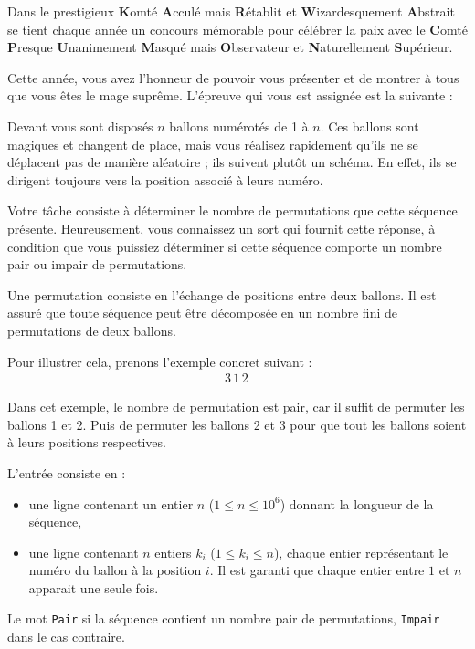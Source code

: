 \problemname{\problemyamlname}


Dans le prestigieux \textbf{K}omté \textbf{A}cculé mais \textbf{R}établit et \textbf{W}izardesquement \textbf{A}bstrait se tient chaque année un concours mémorable pour célébrer la paix avec le \textbf{C}omté \textbf{P}resque \textbf{U}nanimement \textbf{M}asqué mais \textbf{O}bservateur et \textbf{N}aturellement \textbf{S}upérieur.

Cette année, vous avez l'honneur de pouvoir vous présenter et de montrer à tous que vous êtes le mage suprême. L'épreuve qui vous est assignée est la suivante :

Devant vous sont disposés $n$ ballons numérotés de 1 à $n$. Ces ballons sont magiques et changent de place, mais vous réalisez rapidement qu'ils ne se déplacent pas de manière aléatoire ; ils suivent plutôt un schéma. En effet, ils se dirigent toujours vers la position associé à leurs numéro.

Votre tâche consiste à déterminer le nombre de permutations que cette séquence présente. Heureusement, vous connaissez un sort qui fournit cette réponse, à condition que vous puissiez déterminer si cette séquence comporte un nombre pair ou impair de permutations.

Une permutation consiste en l'échange de positions entre deux ballons. Il est assuré que toute séquence peut être décomposée en un nombre fini de permutations de deux ballons.

Pour illustrer cela, prenons l'exemple concret suivant :
\begin{align*}
    3\, 1\, 2\,
\end{align*}

Dans cet exemple, le nombre de permutation est pair, car il suffit de permuter les ballons 1 et 2. Puis de permuter les ballons 2 et 3 pour que tout les ballons soient à leurs positions respectives.

\begin{Input}
    L'entrée consiste en :
    \begin{itemize}
        \item une ligne contenant un entier $n$ ($1 \le n \le 10^6$) donnant la longueur de la séquence,
        \item une ligne contenant $n$ entiers $k_i $ ($1 \le k_i \le n$), chaque entier représentant le numéro du ballon à la position $i$. Il est garanti que chaque entier entre $1$ et $n$ apparait une seule fois.
    \end{itemize}
\end{Input}

\begin{Output}
    Le mot \texttt{Pair} si la séquence contient un nombre pair de permutations, \texttt{Impair} dans le cas contraire.
\end{Output}
